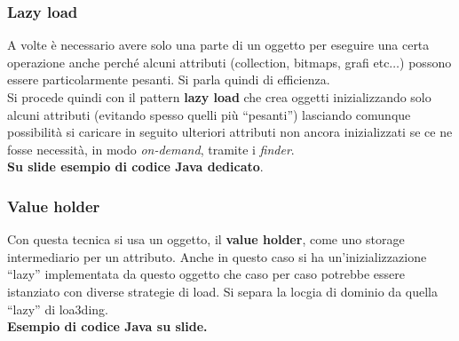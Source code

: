 \documentclass[a4paper,12pt, oneside]{book}
\begin{document}
\subsubsection{Lazy load}
A volte è necessario avere solo una parte di un oggetto per eseguire una certa
operazione anche perché alcuni attributi (collection, bitmaps, grafi
etc$\ldots$) possono essere particolarmente pesanti. Si parla quindi di
efficienza.\\ 
Si procede quindi con il pattern \textbf{lazy load} che crea oggetti
inizializzando solo alcuni attributi (evitando spesso quelli più ``pesanti'')
lasciando comunque possibilità si caricare in seguito ulteriori attributi non
ancora inizializzati se ce ne fosse necessità, in modo \textit{on-demand},
tramite i \textit{finder}.\\
\textbf{Su slide esempio di codice Java dedicato}.
\subsubsection{Value holder}
Con questa tecnica si usa un oggetto, il \textbf{value holder}, come uno storage
intermediario per un attributo. Anche in questo caso si ha un'inizializzazione
``lazy'' implementata da questo oggetto che caso per caso potrebbe essere
istanziato con diverse strategie di load. Si separa la locgia di dominio da
quella ``lazy'' di loa3ding.\\
\textbf{Esempio di codice Java su slide.}
\end{document}
